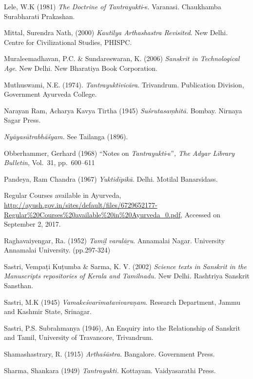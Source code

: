 \begin{thebibliography}{99}
  Lele, W.K (1981) \textit{The Doctrine of Tantrayukti}-s. Varanasi. Chaukhamba Surabharati Prakashan.

  Mittal, Surendra Nath, (2000) \textit{Kautilya Arthashastra Revisited}. New Delhi. Centre for Civilizational Studies, PHISPC.

  Muraleemadhavan, P.C. \& Sundareswaran, K. (2006) \textit{Sanskrit in Technological Age}. New Delhi. New Bharatiya Book Corporation.

  Muthuswami, N.E. (1974). \textit{Tantrayuktivicāra}. Trivandrum. Publication Division, Government Ayurveda College.

  Narayan Ram, Acharya Kavya Tirtha (1945) \textit{Suśrutasaṃhitā.} Bombay. Nirnaya Sagar Press.

  \textit{Nyāyasūtrabhāśyam.} See Tailanga (1896).

  Obberhammer, Gerhard (1968) “Notes on \textit{Tantrayukti}-s”\textit{, The Adyar Library Bulletin}, Vol.~31, pp.~600--611

  Pandeya, Ram Chandra (1967) \textit{Yuktidīpikā}. Delhi. Motilal Banarsidass.

  Regular Courses available in Ayurveda, \url{http://ayush.gov.in/sites/default/files/6729652177-Regular%20Courses%20available%20in%20Ayurveda_0.pdf}, Accessed on September 2, 2017.

  Raghavaiyengar, Ra. (1952) \textit{Tamiḻ varalāṟu}. Annamalai Nagar. University Annamalai University. (pp.297-324)

  Sastri, Vempaṭi Kuṭumba \& Sarma, K. V. (2002) \textit{Science texts in Sanskrit in the Manuscripts repositories of Kerala and Tamilnadu. } New Delhi\textit{.} Rashtriya Sanskrit Sansthan.

  Sastri, M.K (1945) \textit{Vamakeśvarīmatavivaraṇam}. Research Department, Jammu and Kashmir State, Srinagar.

  Sastri, P.S. Subrahmanya (1946), An Enquiry into the Relationship of Sanskrit and Tamil, University of Travancore, Trivandrum.

  Shamashastrary, R. (1915) \textit{Arthaśāstra. } Bangalore\textit{.} Government Press.

  Sharma, Shankara (1949) \textit{Tantrayukti.} Kottayam. Vaidyasarathi Press.


\end{thebibliography}

